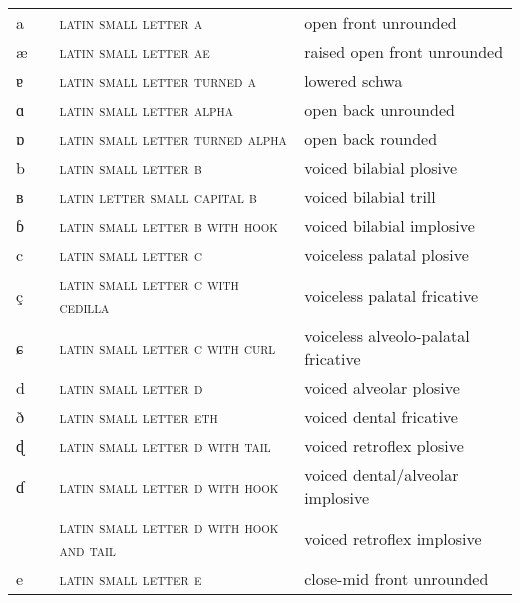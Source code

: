   
 \label{tab:ipa_letters}
 \tabletail{\bottomrule}
  
\begin{center}
\begin{xtabular}{ l l L{4.5cm} L{4.5cm} }
a &  & \textsc{latin small letter a} & open front unrounded \\ 
æ &  & \textsc{latin small letter ae} & raised open front unrounded \\ 
ɐ &  & \textsc{latin small letter turned a} & lowered schwa \\ 
ɑ &  & \textsc{latin small letter alpha} & open back unrounded \\ 
ɒ &  & \textsc{latin small letter turned alpha} & open back rounded \\ 
b &  & \textsc{latin small letter b} & voiced bilabial plosive \\ 
ʙ &  & \textsc{latin letter small capital b} & voiced bilabial trill \\ 
ɓ &  & \textsc{latin small letter b with hook} & voiced bilabial implosive \\ 
c &  & \textsc{latin small letter c} & voiceless palatal plosive \\ 
ç &  & \textsc{latin small letter c with cedilla} & voiceless palatal fricative \\ 
ɕ &  & \textsc{latin small letter c with curl} & voiceless alveolo-palatal fricative \\ 
d &  & \textsc{latin small letter d} & voiced alveolar plosive \\ 
ð &  & \textsc{latin small letter eth} & voiced dental fricative \\ 
ɖ &  & \textsc{latin small letter d with tail} & voiced retroflex plosive \\ 
ɗ &  & \textsc{latin small letter d with hook} & voiced dental/alveolar implosive \\ 
 &  & \textsc{latin small letter d with hook and tail} & voiced retroflex implosive \\ 
e &  & \textsc{latin small letter e} & close-mid front unrounded \\ 

\end{xtabular}
\end{center}
